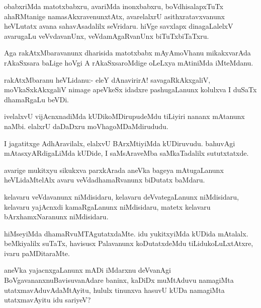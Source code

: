 \documentclass{article}
\begin{document}
\begin{mn}%
obabxriMda matotxbabxru, avariMda inonxbabxru, boVdhisalapxTuTx
ahaRMtanige namasAkxravenunxtAtx, avarelalxrU asithxratavxvanunx
heVLutatx avana sahavAsadalilx seVridaru. hiVge savxlapx dinagaLalelxV
avarugaLu veVvdavanUnx, veVdamAgaRvanUnx biTuTxbiTaTxru.
\end{mn}

\begin{mn}
Aga rakAtxMbaravanunx dharisida matotxbabx mAyAmoVhanu mikakxvarAda
rAkaSxsara baLige hoVgi A rAkaSxsaroMdige oLeLxya mAtiniMda iMteMdanu.
\end{mn}

\begin{mn}
rakAtxMbaranu heVLidanu:- eleY dAnavirirA! savagaRkAkxgaliV,
moVkaSxkAkxgaliV nimage apeVkeSx idadxre pashugaLanunx kolulxva I
duSaTx dhamaRgaLu beVDi.
\end{mn}

\begin{mn}
ivelalxvU vijAcnxnadiMda kUDikoMDirupudeMdu tiLiyiri nananx mAtanunx
naMbi. elalxrU daDaDxru moVhagoMDaMdirududu.
\end{mn}

\begin{mn}
I jagatitxge AdhAravilalx, elalxvU BArxMtiyiMda kUDiruvudu. bahuvAgi
mAtasxyARdigaLiMda kUDide, I saMsAraveMba saMkaTadalilx sututxtatxde.
\end{mn}

\begin{mn}
avarige mukitxyu sikukxva parxkArada aneVka bageya mAtugaLanunx
heVLidaMtelAlx avaru veVdadhamaRvanunx biDutatx baMdaru.
\end{mn}

\begin{mn}
kelavaru veVdavanunx niMdisidaru, kelavaru deVvategaLanunx
niMdisidaru, kelavaru yajAcnxdi kamaRgaLanunx niMdisidaru, matetx
kelavaru bArxhamxNaranunx niMdisidaru.
\end{mn}

\begin{mn}
hiMseyiMda dhamaRvuMTAgutatxdaMte. idu yukitxyiMda kUDida
mAtalalx. beMkiyalilx suTaTx, havisusx Palavanunx koDutatxdeMdu
tiLidukoLuLxtAtxre, ivaru paMDitaraMte.
\end{mn}

\begin{mn}
aneVka yajacnxgaLanunx mADi iMdarxnu deVvanAgi
BoVgavananxnuBavisuvanAdare baninx, kaDiDx muMtAduvu namagiMta
utatxmavAduvAdaMtAyitu, hululx tinunxva hasuvU kUDa namagiMta
utatxmavAyitu idu sariyeV?
\end{mn}
\end{document}

